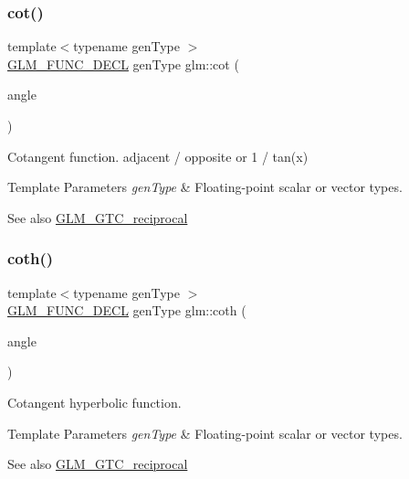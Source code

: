 \subsubsection{\texorpdfstring{cot()}{cot()}}
{\footnotesize\ttfamily template$<$typename gen\+Type $>$ \\
\mbox{\hyperlink{setup_8hpp_ab2d052de21a70539923e9bcbf6e83a51}{G\+L\+M\+\_\+\+F\+U\+N\+C\+\_\+\+D\+E\+CL}} gen\+Type glm\+::cot (\begin{DoxyParamCaption}\item[{gen\+Type}]{angle }\end{DoxyParamCaption})}

Cotangent function. adjacent / opposite or 1 / tan(x)


\begin{DoxyTemplParams}{Template Parameters}
{\em gen\+Type} & Floating-\/point scalar or vector types.\\
\hline
\end{DoxyTemplParams}
\begin{DoxySeeAlso}{See also}
\mbox{\hyperlink{group__gtc__reciprocal}{G\+L\+M\+\_\+\+G\+T\+C\+\_\+reciprocal}} 
\end{DoxySeeAlso}
\mbox{\label{group__gtc__reciprocal_ga6b8b770eb7198e4dea59d52e6db81442}} 
\subsubsection{\texorpdfstring{coth()}{coth()}}
{\footnotesize\ttfamily template$<$typename gen\+Type $>$ \\
\mbox{\hyperlink{setup_8hpp_ab2d052de21a70539923e9bcbf6e83a51}{G\+L\+M\+\_\+\+F\+U\+N\+C\+\_\+\+D\+E\+CL}} gen\+Type glm\+::coth (\begin{DoxyParamCaption}\item[{gen\+Type}]{angle }\end{DoxyParamCaption})}

Cotangent hyperbolic function.


\begin{DoxyTemplParams}{Template Parameters}
{\em gen\+Type} & Floating-\/point scalar or vector types.\\
\hline
\end{DoxyTemplParams}
\begin{DoxySeeAlso}{See also}
\mbox{\hyperlink{group__gtc__reciprocal}{G\+L\+M\+\_\+\+G\+T\+C\+\_\+reciprocal}} 
\end{DoxySeeAlso}
\mbox{\label{group__gtc__reciprocal_ga59dd0005b6474eea48af743b4f14ebbb}} 
